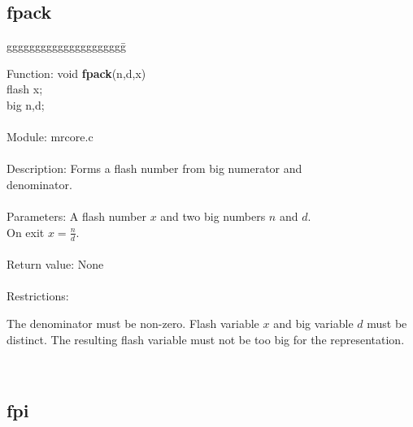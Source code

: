 \subsection{fpack}

\begin{tabbing}
ggggggggggggggggggggg\= \kill

      Function:      \>void {\bf fpack}(n,d,x) \\
                     \>flash x; \\
                     \>big n,d; \\
      \ \\
      Module:        \>mrcore.c \\
      \ \\
      Description:   \>Forms a flash number from big numerator and \\
                     \>denominator. \\
      \ \\
      Parameters:    \>A flash number $x$ and two big numbers $n$ and $d$. \\
                     \>On exit $x=\frac{n}{d}$. \\
      \ \\
      Return value:  \>None \\
      \ \\
      Restrictions:  \>
                     \parbox[t]{3in}
                     {The denominator must be non-zero. Flash variable $x$ and big
                     variable $d$ must be distinct. The resulting flash variable
                     must not be too big for the representation.} \\
      
\end{tabbing}

\subsection{fpi}


